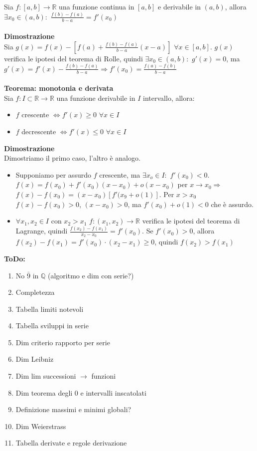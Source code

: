 \documentclass{article}
\begin{document}
Sia $f:[a,b]\rightarrow\mathds{R}$ una funzione continua in $[a,b]$ e derivabile in $(a,b)$, allora $\exists x_0\in(a,b):$ $\frac{f(b)-f(a)}{b-a}=f'(x_0)$\\\\
\textbf{Dimostrazione}\\
Sia $g(x)=f(x)-[f(a)+\frac{f(b)-f(a)}{b-a}(x-a)]$ $\forall x\in[a,b]$. $g(x)$ verifica le ipotesi del teorema di Rolle, quindi $\exists x_0\in(a,b):$ $g'(x)=0$, ma $g'(x)=f'(x)-\frac{f(b)-f(a)}{b-a}\Rightarrow f'(x_0)=\frac{f(a)-f(b)}{b-a}$\\\\
\textbf{Teorema: monotonia e derivata}\\
Sia $f:I\subset\mathds{R}\rightarrow\mathds{R}$ una funzione derivabile in $I$ intervallo, allora:
\begin{itemize}
    \item $f$ crescente $\Leftrightarrow f'(x)\geq0$ $\forall x\in I$
    \item $f$ decrescente $\Leftrightarrow f'(x)\leq0$ $\forall x\in I$
\end{itemize}
\textbf{Dimostrazione}\\
Dimostriamo il primo caso, l'altro è analogo.
\begin{itemize}
    \item Supponiamo per assurdo $f$ crescente, ma $\exists x_o\in I:$ $f'(x_0)<0$.\\
    $f(x)=f(x_0)+f'(x_0)(x-x_0)+o(x-x_0)$ per $x\rightarrow x_0\Rightarrow$ $f(x)-f(x_0)=(x-x_0)[f'(x_9+o(1)]$. Per $x>x_0$ $f(x)-f(x_0)>0$, $(x-x_0)>0$, ma $f'(x_0)+o(1)<0$ che è assurdo.
    \item $\forall x_1,x_2\in I$ con $x_2>x_1$ $f:(x_1,x_2)\rightarrow\mathds{R}$ verifica le ipotesi del teorema di Lagrange, quindi $\frac{f(x_2)-f(x_1)}{x_2-x_0}=f'(x_0)$. Se $f'(x_0)>0$, allora $f(x_2)-f(x_1)=f'(x_0)\cdot(x_2-x_1)\geq0$, quindi $f(x_2)>f(x_1)$
\end{itemize}

\newpage
\textbf{ToDo:}
\begin{enumerate}
    \item No $\bar{9}$ in $\mathds{Q}$ (algoritmo e dim con serie?)
    \item Completezza
    \item Tabella limiti notevoli
    \item Tabella sviluppi in serie
    \item Dim criterio rapporto per serie
    \item Dim Leibniz
    \item Dim lim successioni $\rightarrow$ funzioni
    \item Dim teorema degli 0 e intervalli inscatolati
    \item Definizione massimi e minimi globali?
    \item Dim Weierstrass
    \item Tabella derivate e regole derivazione
\end{enumerate}


\newpage
\renewcommand*\contentsname{Indice}
\tableofcontents
\end{document}
